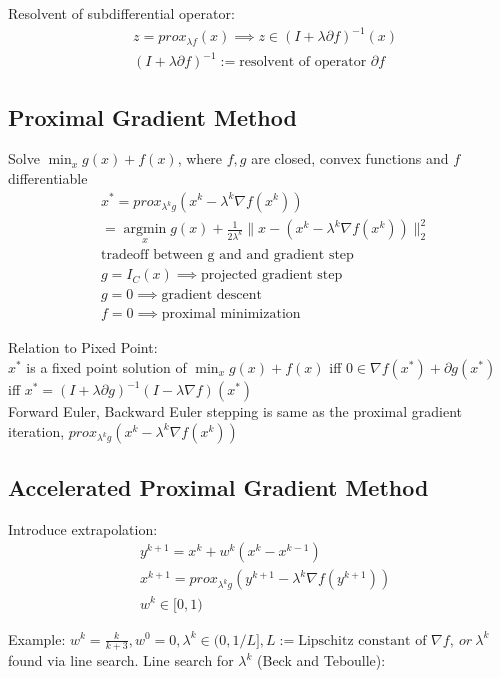 \documentclass[8pt,letter]{article}
\DeclareMathOperator*{\argmin}{argmin}
\newcommand*{\argminl}{\argmin\limits}
\begin{document}
\begin{multicols*}{2}
  Resolvent of subdifferential operator:
  \begin{align*}
    &z=prox_{\lambda f}(x) \implies z \in (I+\lambda \partial f)^{-1}(x)\\
    &(I+\lambda \partial f)^{-1} :=\text{resolvent of operator }\partial f
  \end{align*}
  
  \subsection{Proximal Gradient Method}
  Solve $\min_{x} g(x)+f(x)$, where $f,g$ are closed, convex functions and $f$ differentiable
  \begin{align*}
    &x^* = prox_{\lambda^k g}(x^k-\lambda^k \nabla f(x^k)) \\
    &=\argminl_{x} g(x) + \frac{1}{2 \lambda^k} \|x - (x^k - \lambda^k \nabla f(x^k))\|_2^2\\
    &\text{tradeoff between g and and gradient step}\\
    &g=I_C(x) \implies \text{projected gradient step}\\
    &g=0 \implies \text{gradient descent}\\
    &f=0 \implies \text{proximal minimization}
  \end{align*}

  Relation to Pixed Point:\\
  $x^*$ is a fixed point solution of $\min_{x} g(x)+f(x)$ iff $0 \in \nabla f(x^*) + \partial g(x^*)$ iff $x^* = (I+\lambda \partial g)^{-1}(I-\lambda \nabla f)(x^*)$\\
  
  Forward Euler, Backward Euler stepping is same as the proximal gradient iteration, $prox_{\lambda^k g}(x^k-\lambda^k \nabla f(x^k))$\\

  \subsection{Accelerated Proximal Gradient Method}
  Introduce extrapolation:
  \begin{align*}
    &y^{k+1} = x^k + w^k(x^k-x^{k-1})\\
    &x^{k+1} = prox_{\lambda^k g}(y^{k+1}-\lambda^k \nabla f(y^{k+1}))\\
    &w^k \in [0,1)
  \end{align*}

  Example: $w^k = \frac{k}{k+3}, w^0 = 0, \lambda^k \in (0,1/L], L:= \text{Lipschitz constant of }\nabla f,\ or\ \lambda^k$ found via line search.
  Line search for $\lambda^k$ (Beck and Teboulle):


\end{multicols*}
\end{document}
